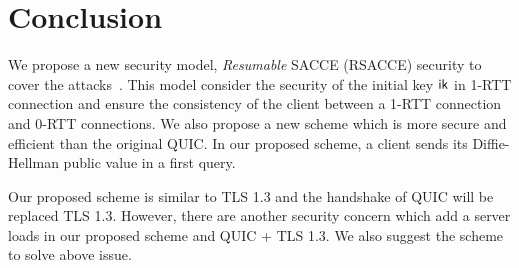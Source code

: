 \section{Conclusion} \label{sec:conclusion}

We propose a new security model, \textit{Resumable} SACCE (RSACCE) security
to cover the attacks~\cite{LJBN15:QUIC}.
This model consider the security of the initial key $\mathsf{ik}$ in 1-RTT connection
and ensure the consistency of the client between a 1-RTT connection and 0-RTT
connections.
We also propose a new scheme which is more secure and efficient than the original QUIC.
In our proposed scheme, a client sends its Diffie-Hellman public value in a
first query.

Our proposed scheme is similar to TLS 1.3 and the handshake of QUIC will be replaced
TLS 1.3. However, there are another security concern which add a server loads in our
proposed scheme and QUIC + TLS 1.3.
We also suggest the scheme to solve above issue.